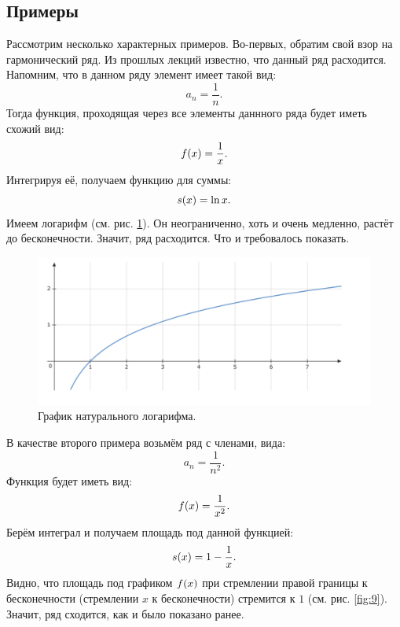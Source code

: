 \documentclass[12pt]{article}
\begin{document}
\subsection{Примеры}
Рассмотрим несколько характерных примеров. Во\--первых, обратим свой взор на гармонический ряд. Из прошлых лекций известно, что данный ряд расходится. Напомним, что в данном ряду элемент имеет такой вид:
\begin{equation}
    a_n = \dfrac{1}{n}.
\end{equation}
Тогда функция, проходящая через все элементы даннного ряда будет иметь схожий вид:
\begin{equation}
    f\qty(x) = \dfrac{1}{x}.
\end{equation}
Интегрируя её, получаем функцию для суммы:
\begin{equation}
    s\qty(x) = \ln{x}.
\end{equation}
Имеем логарифм (см. рис. \ref{fig:8}). Он неограниченно, хоть и очень медленно, растёт до бесконечности. Значит, ряд расходится. Что и требовалось показать.
\begin{figure}[hbt]
    \centering
    \includegraphics[width = 1\textwidth]{Лекция 2/fig8.png}
    \caption{График натурального логарифма.}
    \label{fig:8}
\end{figure}
\par
В качестве второго примера возьмём ряд с членами, вида:
\begin{equation}
    a_n = \dfrac{1}{n^2}.
\end{equation}
Функция будет иметь вид:
\begin{equation}
    f\qty(x) = \dfrac{1}{x^2}.
\end{equation}
Берём интеграл и получаем площадь под данной функцией:
\begin{equation}
    s\qty(x) = 1 - \dfrac{1}{x}.
\end{equation}
Видно, что площадь под графиком $f\qty(x)$ при стремлении правой границы к бесконечности (стремлении $x$ к бесконечности) стремится к $1$ (см. рис. \ref{fig:9}). Значит, ряд сходится, как и было показано ранее. 
\end{document}
